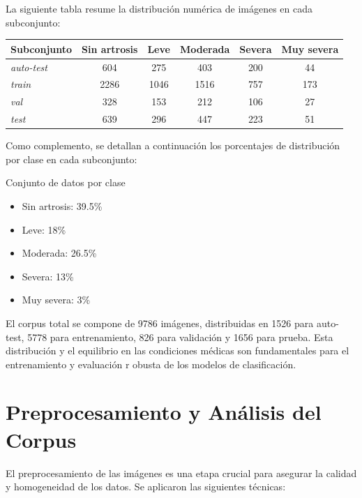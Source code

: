\documentclass[11pt,spanish,listoffigures,listoftables]{tfgetsinf}
\begin{document}
La siguiente tabla resume la distribución numérica de imágenes en cada subconjunto:
\begin{center}
\begin{tabular}{lccccc}
\toprule
\textbf{Subconjunto} & \textbf{Sin artrosis} & \textbf{Leve} & \textbf{Moderada} & \textbf{Severa} & \textbf{Muy severa} \\
\midrule
\textit{auto-test} & 604 & 275 & 403 & 200 & 44 \\
\textit{train}     & 2286 & 1046 & 1516 & 757 & 173 \\
\textit{val}       & 328 & 153 & 212 & 106 & 27 \\
\textit{test}      & 639 & 296 & 447 & 223 & 51 \\
\bottomrule
\end{tabular}
\end{center}

Como complemento, se detallan a continuación los porcentajes de distribución por clase en cada
 subconjunto:

Conjunto de datos por clase
\begin{itemize}
    \item Sin artrosis: 39.5\%
    \item Leve: 18\%
    \item Moderada: 26.5\%
    \item Severa: 13\%
    \item Muy severa: 3\%
\end{itemize}
El corpus total se compone de 9786 imágenes, distribuidas en 1526 para auto-test, 5778 para entrenamiento, 826 para validación y 
1656 para prueba. Esta distribución y el equilibrio en las condiciones médicas son fundamentales para el entrenamiento y evaluación r
obusta de los modelos de clasificación.

\section{Preprocesamiento y Análisis del Corpus}
El preprocesamiento de las imágenes es una etapa crucial para asegurar la calidad y homogeneidad de los datos. Se aplicaron las siguientes técnicas:
\end{document}
